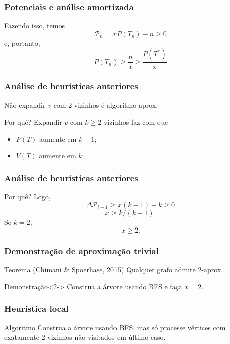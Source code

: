 \documentclass[14pt]{beamer}
\begin{document}
\begin{frame}
\frametitle{Potenciais e an\'alise amortizada}
Fazendo isso, temos
\begin{equation}
\mathcal{P}_n = xP(T_n) - n \ge 0
\end{equation}
e, portanto,
\begin{equation}
P(T_n) \ge \frac{n}{x} \ge \frac{P(T^*)}{x}
\end{equation}
\end{frame}

\begin{frame}
\frametitle{An\'alise de heur\'isticas anteriores}
N\~ao expandir $v$ com 2 vizinhos \'e algoritmo aprox.
\pause
\begin{block}{Por qu\^e?}
Expandir $v$ com $k \ge 2$ vizinhos faz com que
\begin{itemize}
\item $P(T)$ aumente em $k - 1$;
\item $V(T)$ aumente em $k$;
\end{itemize}
\end{block}
\end{frame}

\begin{frame}
\frametitle{An\'alise de heur\'isticas anteriores}
\begin{block}{Por qu\^e?}
Logo,
\begin{equation}
\Delta \mathcal{P}_{i + 1} \ge x(k - 1) - k \ge 0
\end{equation}
\begin{equation}
x \ge k/(k - 1).
\end{equation}
\pause
Se $k = 2$,
\begin{equation}
x \ge 2.
\end{equation}
\end{block}
\end{frame}

\begin{frame}
\frametitle{Demonstra\c{c}\~ao de aproxima\c{c}\~ao trivial}
\begin{block}{Teorema (Chimani \& Spoerhase, 2015)}
Qualquer grafo admite 2-aprox.
\end{block}

\begin{block}{Demonstra\c{c}\~ao}<2->
Construa a \'arvore usando BFS e fa\c{c}a $x = 2$.
\end{block}
\end{frame}

\begin{frame}
\frametitle{Heur\'istica local}
\begin{block}{Algoritmo}
Construa a \'arvore usando BFS, mas s\'o processe v\'ertices com exatamente 2 vizinhos n\~ao visitados em \'ultimo caso.
\end{block}
\end{frame}
\end{document}

